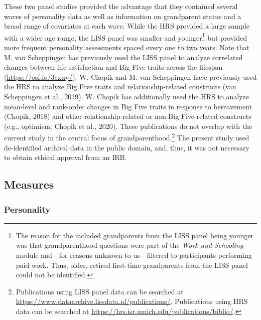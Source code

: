 \documentclass[
  english,
  man, noextraspace]{apa7}
\begin{document}
These two panel studies provided the advantage that they contained several waves of personality data as well as information on grandparent status and a broad range of covariates at each wave. While the HRS provided a large sample with a wider age range, the LISS panel was smaller and younger\footnote{The reason for the included grandparents from the LISS panel being younger was that grandparenthood questions were part of the \emph{Work and Schooling} module and---for reasons unknown to us---filtered to participants performing paid work. Thus, older, retired first-time grandparents from the LISS panel could not be identified.} but provided more frequent personality assessments spaced every one to two years. Note that M. van Scheppingen has previously used the LISS panel to analyze correlated changes between life satisfaction and Big Five traits across the lifespan (\url{https://osf.io/3cxuy/}). W. Chopik and M. van Scheppingen have previously used the HRS to analyze Big Five traits and relationship-related constructs (van Scheppingen et al., 2019). W. Chopik has additionally used the HRS to analyze mean-level and rank-order changes in Big Five traits in response to bereavement (Chopik, 2018) and other relationship-related or non-Big Five-related constructs (e.g., optimism; Chopik et al., 2020). These publications do not overlap with the current study in the central focus of grandparenthood.\footnote{Publications using LISS panel data can be searched at \url{https://www.dataarchive.lissdata.nl/publications/}. Publications using HRS data can be searched at \url{https://hrs.isr.umich.edu/publications/biblio/}.} The present study used de-identified archival data in the public domain, and, thus, it was not necessary to obtain ethical approval from an IRB.

\hypertarget{measures}{%
\subsection{Measures}\label{measures}}

\hypertarget{personality}{%
\subsubsection{Personality}\label{personality}}
\end{document}
